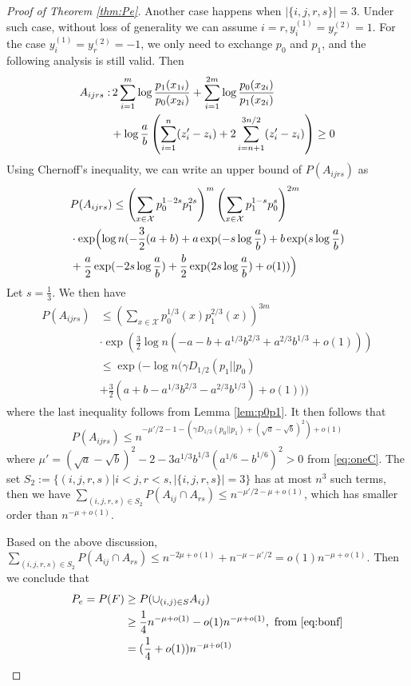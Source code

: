 \documentclass[conference,letterpaper]{IEEEtran}
\begin{document}
\begin{proof}[Proof of Theorem \ref{thm:Pe}]
Another case happens when $|\{i,j,r,s\}|=3$. Under such case, without loss of generality we can assume $i=r, y^{(1)}_i = y^{(2)}_r = 1$.
For the case $y^{(1)}_i = y^{(2)}_r = -1$, we only need to exchange
$p_0$ and $p_1$, and the following analysis is still valid.
Then
\begin{align}
A_{ijrs}: &\, 2\sum_{i=1}^m  \log \frac{p_1(x_{1i})}{p_0(x_{2i})}
+ \sum_{i=1}^{2m} \log \frac{p_0(x_{2i})}{p_1(x_{2i})} \\
& +\log\frac{a}{b}\left(
\sum_{i=1}^{n} (z'_i - z_i) + 2\sum_{i=n+1}^{3n/2} (z'_i - z_i)\right)  \geq 0\notag
\end{align}
Using Chernoff's inequality, we can write an upper bound of $P(A_{ijrs})$ as
\begin{align*}
&P(A_{ijrs}) \leq
\left(\sum_{x\in \mathcal{X}} p_0^{1-2s}p_1^{2s}\right)^m
\left(\sum_{x\in \mathcal{X}} p_1^{1-s}p_0^{s}\right)^{2m} \\
& \cdot\exp\Bigl(\log n (-\frac{3}{2}(a+b)+a\exp(-s\log \frac{a}{b})+b\exp(s\log \frac{a}{b}) \\
&+ \frac{a}{2}\exp(-2s\log \frac{a}{b})+\frac{b}{2}\exp(2s\log \frac{a}{b})+o(1))\Bigr)
\end{align*}
Let $s=\frac{1}{3}$. We then have
\begin{align*}
P(A_{ijrs})&\leq  (\sum_{x\in \mathcal{X}} p_0^{1/3}(x)p_1^{2/3}(x))^{3m}\\
& \cdot \exp(\frac{3}{2}\log n (-a-b+a^{1/3}b^{2/3}+a^{2/3}b^{1/3}+o(1))) \\
&\leq   \exp(-\log n(\gamma D_{1/2}(p_1 || p_0) \\
&+ \frac{3}{2} (a+b-a^{1/3}b^{2/3}-a^{2/3}b^{1/3})+o(1)))
\end{align*}
where the last inequality follows from Lemma \ref{lem:p0p1}.
It then follows that
$$
P(A_{ijrs}) \leq n^{-\mu'/2-1-(\gamma  D_{1/2}(p_0||p_1) + (\sqrt{a} - \sqrt{b})^2) + o(1)}
$$
where $\mu'=(\sqrt{a}-\sqrt{b})^2-2 
- 3a^{1/3}b^{1/3}(a^{1/6}-b^{1/6})^2>0$ from \eqref{eq:oneC}. 
The set $S_2:=\{(i,j,r,s)| i<j, r<s, |\{i,j,r,s\}|=3\}$
has at most $n^3$ such terms,
then we have $\sum_{(i,j,r,s)\in S_2}
P(A_{ij}\cap A_{rs}) \leq n^{-\mu'/2-\mu+o(1)}$,
which has smaller order than $n^{-\mu+o(1)}$.

Based on the above discussion, 
$\sum_{(i,j,r,s)\in S_2} P(A_{ij} \cap A_{rs})\leq n^{-2\mu + o(1)}
+ n^{-\mu - \mu'/2} = o(1) n^{-\mu + o(1)}$.
Then we conclude that 
\begin{align*}
P_e=P(F) & \geq P(\cup_{(i,j)\in S} A_{ij}) \\
& \geq \frac{1}{4} n^{-\mu+o(1)}- o(1)n^{-\mu + o(1)},
\textrm{ from } \eqref{eq:bonf}  \\
&=(\frac{1}{4}+o(1))n^{-\mu + o(1)}
\end{align*}
\end{proof}
\end{document}
